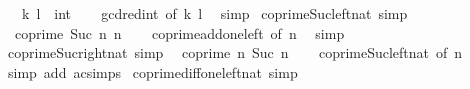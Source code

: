 \begin{isabellebody}
\ \ \ k\ l\ {\isacharcolon}{\kern0pt}{\isacharcolon}{\kern0pt}\ int\isanewline
%
\isadelimproof
\ \ %
\endisadelimproof
%
\isatagproof
{}\isamarkupfalse%
\ gcd{\isacharunderscore}{\kern0pt}red{\isacharunderscore}{\kern0pt}int\ {\isacharbrackleft}{\kern0pt}of\ {\isachardoublequoteopen}{\isasymbar}k{\isasymbar}{\isachardoublequoteclose}\ {\isachardoublequoteopen}{\isasymbar}l{\isasymbar}{\isachardoublequoteclose}{\isacharbrackright}{\kern0pt}\ \isamarkupfalse%
\ simp%
\endisatagproof
{\isafoldproof}%
%
\isadelimproof
\isanewline
%
\endisadelimproof
\isanewline
{}\isamarkupfalse%
\ coprime{\isacharunderscore}{\kern0pt}Suc{\isacharunderscore}{\kern0pt}left{\isacharunderscore}{\kern0pt}nat\ {\isacharbrackleft}{\kern0pt}simp{\isacharbrackright}{\kern0pt}{\isacharcolon}{\kern0pt}\isanewline
\ \ {\isachardoublequoteopen}coprime\ {\isacharparenleft}{\kern0pt}Suc\ n{\isacharparenright}{\kern0pt}\ n{\isachardoublequoteclose}\isanewline
%
\isadelimproof
\ \ %
\endisadelimproof
%
\isatagproof
{}\isamarkupfalse%
\ coprime{\isacharunderscore}{\kern0pt}add{\isacharunderscore}{\kern0pt}one{\isacharunderscore}{\kern0pt}left\ {\isacharbrackleft}{\kern0pt}of\ n{\isacharbrackright}{\kern0pt}\ \isamarkupfalse%
\ simp%
\endisatagproof
{\isafoldproof}%
%
\isadelimproof
\isanewline
%
\endisadelimproof
\isanewline
{}\isamarkupfalse%
\ coprime{\isacharunderscore}{\kern0pt}Suc{\isacharunderscore}{\kern0pt}right{\isacharunderscore}{\kern0pt}nat\ {\isacharbrackleft}{\kern0pt}simp{\isacharbrackright}{\kern0pt}{\isacharcolon}{\kern0pt}\isanewline
\ \ {\isachardoublequoteopen}coprime\ n\ {\isacharparenleft}{\kern0pt}Suc\ n{\isacharparenright}{\kern0pt}{\isachardoublequoteclose}\isanewline
%
\isadelimproof
\ \ %
\endisadelimproof
%
\isatagproof
{}\isamarkupfalse%
\ coprime{\isacharunderscore}{\kern0pt}Suc{\isacharunderscore}{\kern0pt}left{\isacharunderscore}{\kern0pt}nat\ {\isacharbrackleft}{\kern0pt}of\ n{\isacharbrackright}{\kern0pt}\ \isamarkupfalse%
\ {\isacharparenleft}{\kern0pt}simp\ add{\isacharcolon}{\kern0pt}\ ac{\isacharunderscore}{\kern0pt}simps{\isacharparenright}{\kern0pt}%
\endisatagproof
{\isafoldproof}%
%
\isadelimproof
\isanewline
%
\endisadelimproof
\isanewline
{}\isamarkupfalse%
\ coprime{\isacharunderscore}{\kern0pt}diff{\isacharunderscore}{\kern0pt}one{\isacharunderscore}{\kern0pt}left{\isacharunderscore}{\kern0pt}nat\ {\isacharbrackleft}{\kern0pt}simp{\isacharbrackright}{\kern0pt}{\isacharcolon}{\kern0pt}\isanewline

\end{isabellebody}
